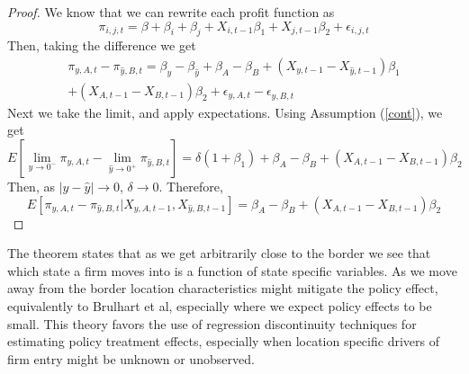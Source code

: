 \begin{proof}
We know that we can rewrite each profit function as
$$\pi_{i,j,t} =  \beta+\beta_{i}+\beta_{j}+X_{i,t-1}\beta_{1}+X_{j,t-1}\beta_{2}+\epsilon_{i,j,t}$$
Then, taking the difference we get
\begin{align} \pi_{y,A,t}-\pi_{\hat y,B,t} = \beta_{y}-\beta_{\hat y}+\beta_{A}-\beta_{B}+(X_{y,t-1}-X_{\hat y,t-1})\beta_{1} \\+(X_{A,t-1}-X_{B,t-1})\beta_{2}+\epsilon_{y,A,t}-\epsilon_{\hat y,B,t}
\end{align}
Next we take the limit, and apply expectations. Using Assumption (\ref{cont}), we get
$$E[\lim_{y \to 0^{-}}\pi_{y,A,t}-\lim_{\hat y \to 0^{+}}\pi_{\hat y,B,t}] = \delta(1+\beta_{1})+\beta_{A}-\beta_{B}+(X_{A,t-1}-X_{B,t-1})\beta_{2}$$
Then, as $|y-\hat y| \to 0$, $\delta \to 0$. Therefore,
\begin{equation}
E[\pi_{y,A,t}-\pi_{\hat y,B,t}|X_{y,A,t-1},X_{\hat y,B,t-1}] =  \beta_{A}-\beta_{B}+(X_{A,t-1}-X_{B,t-1})\beta_{2}
\end{equation}
\end{proof}

The theorem states that as we get arbitrarily close to the border we see that which state a firm moves into is a function of state specific variables. As we move away from the border location characteristics might mitigate the policy effect, equivalently to Brulhart et al, especially where we expect policy effects to be small. This theory favors the use of regression discontinuity techniques for estimating policy treatment effects, especially when location specific drivers of firm entry might be unknown or unobserved.
